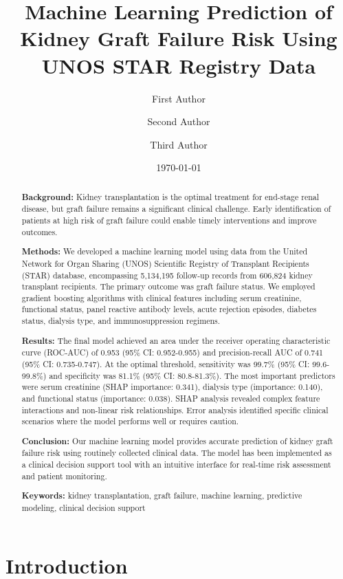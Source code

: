 \documentclass[12pt,a4paper]{article}
\title{Machine Learning Prediction of Kidney Graft Failure Risk Using UNOS STAR Registry Data}
\author[1]{First Author}
\author[1]{Second Author}
\author[2]{Third Author}
\affil[1]{Department of Computer Science, University Name, City, Country}
\affil[2]{Department of Medicine, Medical Center, City, Country}
\date{\today}
\begin{document}
\maketitle

\begin{abstract}
\textbf{Background:} Kidney transplantation is the optimal treatment for end-stage renal disease, but graft failure remains a significant clinical challenge. Early identification of patients at high risk of graft failure could enable timely interventions and improve outcomes.

\textbf{Methods:} We developed a machine learning model using data from the United Network for Organ Sharing (UNOS) Scientific Registry of Transplant Recipients (STAR) database, encompassing 5,134,195 follow-up records from 606,824 kidney transplant recipients. The primary outcome was graft failure status. We employed gradient boosting algorithms with clinical features including serum creatinine, functional status, panel reactive antibody levels, acute rejection episodes, diabetes status, dialysis type, and immunosuppression regimens.

\textbf{Results:} The final model achieved an area under the receiver operating characteristic curve (ROC-AUC) of 0.953 (95\% CI: 0.952-0.955) and precision-recall AUC of 0.741 (95\% CI: 0.735-0.747). At the optimal threshold, sensitivity was 99.7\% (95\% CI: 99.6-99.8\%) and specificity was 81.1\% (95\% CI: 80.8-81.3\%). The most important predictors were serum creatinine (SHAP importance: 0.341), dialysis type (importance: 0.140), and functional status (importance: 0.038). SHAP analysis revealed complex feature interactions and non-linear risk relationships. Error analysis identified specific clinical scenarios where the model performs well or requires caution.

\textbf{Conclusion:} Our machine learning model provides accurate prediction of kidney graft failure risk using routinely collected clinical data. The model has been implemented as a clinical decision support tool with an intuitive interface for real-time risk assessment and patient monitoring.

\textbf{Keywords:} kidney transplantation, graft failure, machine learning, predictive modeling, clinical decision support
\end{abstract}

\section{Introduction}
\end{document}
